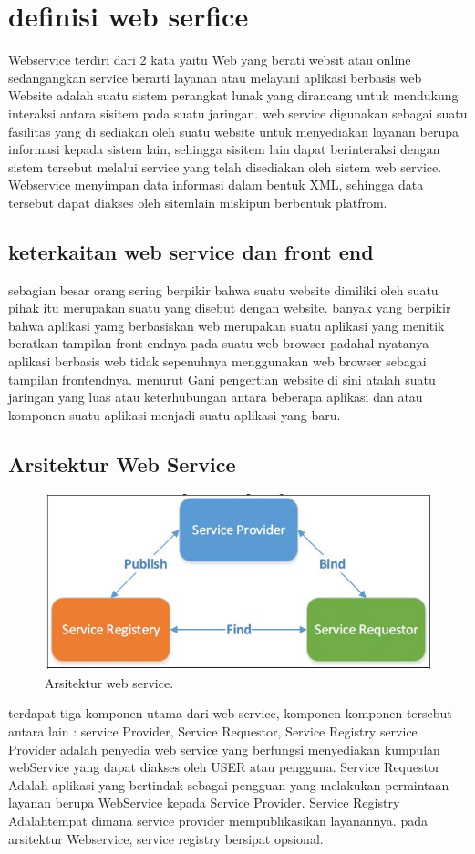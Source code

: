 \section{definisi web serfice }
Webservice terdiri dari 2 kata yaitu Web yang berati websit atau online 
sedangangkan service berarti layanan atau melayani aplikasi berbasis web 
Website adalah suatu sistem perangkat lunak yang dirancang untuk mendukung interaksi antara sisitem pada suatu jaringan.
web service digunakan sebagai suatu fasilitas yang di sediakan oleh suatu website untuk menyediakan layanan berupa informasi kepada 
sistem lain, sehingga sisitem lain dapat berinteraksi dengan sistem tersebut melalui service yang telah disediakan oleh sistem web service.
Webservice menyimpan data informasi dalam bentuk XML, sehingga data tersebut dapat diakses oleh sitemlain miskipun berbentuk platfrom. 
\subsection{keterkaitan web service dan front end }
sebagian besar orang sering berpikir bahwa suatu website dimiliki oleh suatu pihak 
itu merupakan suatu yang disebut dengan website. banyak yang berpikir bahwa aplikasi yamg berbasiskan 
web merupakan suatu aplikasi yang menitik beratkan tampilan front endnya pada suatu web browser 
padahal nyatanya aplikasi berbasis web tidak sepenuhnya menggunakan web browser sebagai tampilan 
frontendnya. menurut Gani pengertian website di sini atalah suatu jaringan yang luas atau keterhubungan 
antara beberapa aplikasi dan atau komponen suatu aplikasi menjadi suatu aplikasi yang baru.
\subsection{Arsitektur Web Service}
\begin{figure}[ht]
\centerline{\includegraphics[width=1\textwidth]{figures/1arsitektur.JPG}}
\caption{Arsitektur web service.}
\end{figure}
terdapat tiga komponen utama dari web service, komponen komponen tersebut antara lain :
service Provider, Service Requestor, Service Registry 
service Provider adalah penyedia web service yang berfungsi menyediakan kumpulan webService yang dapat diakses oleh USER atau pengguna.
Service Requestor Adalah aplikasi yang bertindak sebagai pengguan yang melakukan permintaan layanan berupa WebService kepada Service Provider.
Service Registry Adalahtempat dimana service provider mempublikasikan layanannya. pada arsitektur Webservice, service registry bersipat opsional.\cite{kurniawan2015implementasi}


